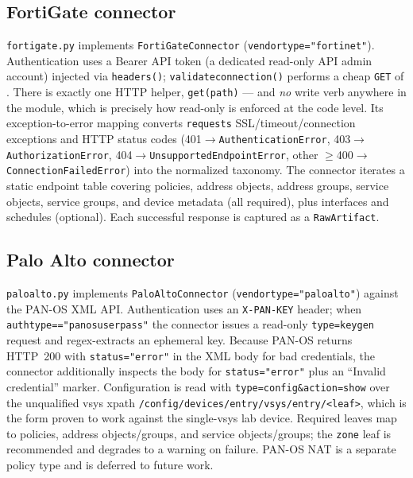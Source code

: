 \documentclass[12pt,a4paper]{report}
\renewcommand{\_}{\textunderscore\allowbreak}
\begin{document}
\subsection*{FortiGate connector}

\texttt{fortigate.py} implements \texttt{FortiGateConnector} (\texttt{vendor\_type="fortinet"}). Authentication uses a Bearer API token (a dedicated read-only API admin account) injected via \texttt{\_headers()}; \texttt{validate\_connection()} performs a cheap \texttt{GET} of . There is exactly one HTTP helper, \texttt{\_get(path)} --- and \emph{no} write verb anywhere in the module, which is precisely how read-only is enforced at the code level. Its exception-to-error mapping converts \texttt{requests} SSL/timeout/connection exceptions and HTTP status codes (401$\rightarrow$\texttt{AuthenticationError}, 403$\rightarrow$\texttt{AuthorizationError}, 404$\rightarrow$\texttt{UnsupportedEndpointError}, other $\geq$400$\rightarrow$\texttt{ConnectionFailedError}) into the normalized taxonomy. The connector iterates a static endpoint table covering policies, address objects, address groups, service objects, service groups, and device metadata (all required), plus interfaces and schedules (optional). Each successful response is captured as a \texttt{RawArtifact}.

\subsection*{Palo Alto connector}

\texttt{paloalto.py} implements \texttt{PaloAltoConnector} (\texttt{vendor\_type="paloalto"}) against the PAN-OS XML API. Authentication uses an \texttt{X-PAN-KEY} header; when \texttt{auth\_type=="panos\_userpass"} the connector issues a read-only \texttt{type=keygen} request and regex-extracts an ephemeral key. Because PAN-OS returns HTTP~200 with \texttt{status="error"} in the XML body for bad credentials, the connector additionally inspects the body for \texttt{status="error"} plus an ``Invalid credential'' marker. Configuration is read with \texttt{type=config\&action=show} over the unqualified vsys xpath \texttt{/config/devices/entry/vsys/entry/<leaf>}, which is the form proven to work against the single-vsys lab device. Required leaves map to policies, address objects/groups, and service objects/groups; the \texttt{zone} leaf is recommended and degrades to a warning on failure. PAN-OS NAT is a separate policy type and is deferred to future work.
\end{document}
